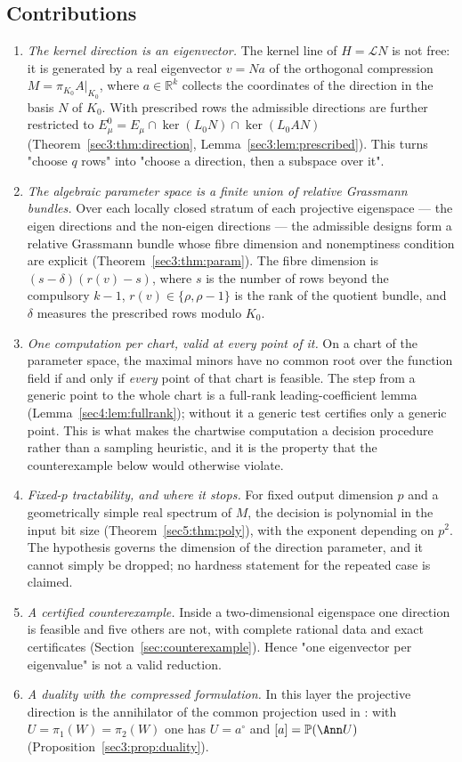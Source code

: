 \subsection{Contributions}\label{sec:intro:contributions}

\begin{enumerate}[label=(\Alph*),leftmargin=*]
\item \emph{The kernel direction is an eigenvector.} The kernel line of $H=\mathcal LN$ is not free: it
is generated by a real eigenvector $v=Na$ of the orthogonal compression $M=\pi_{K_0}A|_{K_0}$, where
$a\in\mathbb R^k$ collects the coordinates of the direction in the basis $N$ of $K_0$. With prescribed
rows the admissible directions are further restricted to
$E_\mu^0=E_\mu\cap\ker(L_0N)\cap\ker(L_0AN)$ (Theorem~\ref{sec3:thm:direction},
Lemma~\ref{sec3:lem:prescribed}). This turns "choose $q$ rows" into "choose a direction, then a
subspace over it".
\item \emph{The algebraic parameter space is a finite union of relative Grassmann bundles.} Over each
locally closed stratum of each projective eigenspace --- the eigen directions and the non-eigen
directions --- the admissible designs form a relative Grassmann bundle whose fibre dimension and
nonemptiness condition are explicit (Theorem~\ref{sec3:thm:param}). The fibre dimension is
$(s-\delta)(r(v)-s)$, where $s$ is the number of rows beyond the compulsory $k-1$, $r(v)\in\{\rho,\rho-1\}$
is the rank of the quotient bundle, and $\delta$ measures the prescribed rows modulo $K_0$.
\item \emph{One computation per chart, valid at every point of it.} On a chart of the parameter space,
the maximal minors have no common root over the function field if and only if \emph{every} point of
that chart is feasible. The step from a generic point to the whole chart is a full-rank
leading-coefficient lemma (Lemma~\ref{sec4:lem:fullrank}); without it a generic test certifies only a
generic point. This is what makes the chartwise computation a decision procedure rather than a
sampling heuristic, and it is the property that the counterexample below would otherwise violate.
\item \emph{Fixed-$p$ tractability, and where it stops.} For fixed output dimension $p$ and a
geometrically simple real spectrum of $M$, the decision is polynomial in the input bit size
(Theorem~\ref{sec5:thm:poly}), with the exponent depending on $p^2$. The hypothesis governs the
dimension of the direction parameter, and it cannot simply be dropped; no hardness statement for the
repeated case is claimed.
\item \emph{A certified counterexample.} Inside a two-dimensional eigenspace one direction is feasible
and five others are not, with complete rational data and exact certificates
(Section~\ref{sec:counterexample}). Hence "one eigenvector per eigenvalue" is not a valid reduction.
\item \emph{A duality with the compressed formulation.} In this layer the projective direction is the
annihilator of the common projection used in \cite{companion2}: with $U=\pi_1(W)=\pi_2(W)$ one has
$U=a^\circ$ and $[a]=\mathbb P(\Ann U)$ (Proposition~\ref{sec3:prop:duality}).
\end{enumerate}

